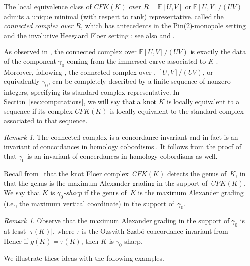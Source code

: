 \documentclass[11pt, reqno]{amsart}
\theoremstyle{definition}
\theoremstyle{remark}
\newtheorem{remark}[theorem]{Remark}
\def\F{\mathbb{F}}
\def\CFK{\mathit{CFK}}
\numberwithin{equation}{section}
\begin{document}
The local equivalence class of $\CFK(K)$ over $R=\F[U,V]$ or $\F[U,V]/(UV)$ admits a unique minimal (with respect to rank) representative, called the \emph{connected complex over $R$}, which has antecedents in the Pin(2)-monopole setting \cite[Section 2.5]{Stoffregen-Pin2} and the involutive Heegaard Floer setting \cite[Section 3]{HHL}; see also \cite[Section 6]{Zhou-homconc} and \cite[Section 5]{HKPS:2022}.

As observed in \cite[Proposition 2]{Hanselman-Watson:2023}, the connected complex over $\F[U,V]/(UV)$ is exactly the data of the component $\gamma_0$ coming from the immersed curve associated to $K$ \cite{HRW:2024}. Moreover, following \cite[Section 4]{DHST-conc}, the connected complex over $\F[U,V]/(UV)$, or equivalently $\gamma_0$, can be completely described by a finite sequence of nonzero integers, specifying its standard complex representative. In Section~\ref{sec:computations}, we will say that a knot $K$ is locally equivalent to a sequence if its complex $\CFK(K)$ is locally equivalent to the standard complex associated to that sequence.


\begin{remark}\label{rmk:homologyconcordance}
The connected complex is a concordance invariant and in fact is an invariant of concordances in homology cobordisms \cite{DHST-homconc}. It follows from the proof of \cite[Proposition 2]{Hanselman-Watson:2023} that $\gamma_0$ is an invariant of concordances in homology cobordisms as well.
\end{remark}

Recall from~\cite{OS-genus} that the knot Floer complex~$\CFK(K)$ detects the genus of~$K$, in that the genus is the maximum Alexander grading in the support of~$\CFK(K)$. We say that $K$ is \emph{$\gamma_0$-sharp} if the genus of~$K$ is the maximum Alexander grading (i.e., the maximum vertical coordinate) in the support of~$\gamma_0$.



\begin{remark}\label{rmk:tightfiberedgammashparp}
Observe that the maximum Alexander grading in the support of $\gamma_0$ is at least $|\tau(K)|$, where $\tau$ is the Ozsv\'ath-Szab\'o concordance invariant from \cite{Oz-Sz:2003}. Hence if $g(K)=\tau(K)$, then $K$ is $\gamma_0$-sharp.
\end{remark}

We illustrate these ideas with the following examples.
\end{document}

